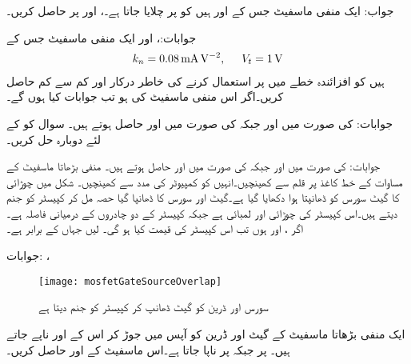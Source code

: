 جواب: 
ایک منفی ماسفیٹ جس کے  اور  ہیں کو  پر چلایا جاتا ہے۔،  اور  پر  حاصل کریں۔

جوابات:، اور 
ایک منفی ماسفیٹ جس کے
\begin{align*}
k_n=\SI{0.08}{\milli \ampere \per \volt \squared}, \hspace{5mm} V_t=\SI{1}{\volt}
\end{align*}
ہیں کو افزائندہ خطے میں  پر استعمال کرنے کی خاطر درکار  اور کم سے کم  حاصل کریں۔اگر اس منفی ماسفیٹ کی  ہو تب جوابات کیا ہوں گے۔

جوابات: کی صورت میں  اور  جبکہ  کی صورت میں   اور  حاصل ہوتے ہیں۔
سوال  کو  کے لئے دوبارہ حل کریں۔

جوابات: کی صورت میں  اور  جبکہ  کی صورت میں   اور  حاصل ہوتے ہیں۔
منفی بڑھاتا ماسفیٹ کے مساوات کے خط کاغذ پر قلم سے کھینچیں۔انہیں کو کمپیوٹر کی مدد سے کھینچیں۔
شکل  میں  چوڑائی کا گیٹ سورس کو ڈھانپتا ہوا دکھایا گیا ہے۔گیٹ اور سورس کا ڈھانپا گیا حصہ مل کر کپیسٹر  کو جنم دیتے ہیں۔اس کپیسٹر کی چوڑائی  اور لمبائی  ہے جبکہ کپیسٹر کے دو چادروں کے درمیانی فاصلہ  ہے۔اگر ،  اور  ہوں تب اس کپیسٹر کی قیمت کیا ہو گی۔ لیں جہاں  کے برابر ہے۔

جوابات: ، 
\begin{figure}
\centering
\texttt{[image: mosfetGateSourceOverlap]}
\caption{سورس اور ڈرین کو گیٹ ڈھانپ کر کپیسٹر کو جنم دیتا ہے}
\label{شکل_ماسفیٹ_گیٹ_مخارج_محاصل_کپیسٹر}
\end{figure}
ایک منفی بڑھاتا ماسفیٹ کے گیٹ اور ڈرین کو آپس میں جوڑ کر اس کے  اور  ناپے جاتے ہیں۔ پر  جبکہ  پر  ناپا جاتا ہے۔اس ماسفیٹ کے  اور  حاصل کریں۔

